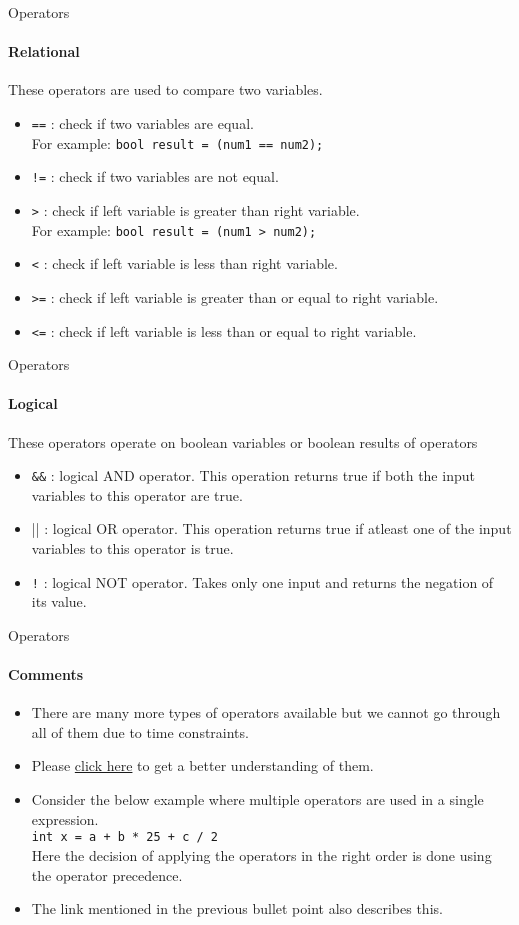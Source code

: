 \documentclass[aspectratio=169]{beamer}
\begin{document}
\begin{frame}[fragile]{Operators}
    \framesubtitle{Relational}
    These operators are used to compare two variables.
    \begin{itemize}
        \item \verb|==| : check if two variables are equal. \\For example: \verb|bool result = (num1 == num2);|
        \item \verb|!=| : check if two variables are not equal.
        \item \verb|>| : check if left variable is greater than right variable.\\For example: \verb|bool result = (num1 > num2);|
        \item \verb|<| : check if left variable is less than right variable.
        \item \verb|>=| : check if left variable is greater than or equal to right variable.
        \item \verb|<=| : check if left variable is less than or equal to right variable.
    \end{itemize}
\end{frame}

\begin{frame}[fragile]{Operators}
    \framesubtitle{Logical}
    These operators operate on boolean variables or boolean results of operators
    \begin{itemize}
        \item \verb|&&| : logical AND operator. This operation returns true if both the input variables to this operator are true.
        \item || : logical OR operator. This operation returns true if atleast one of the input variables to this operator is true.
        \item \verb|!| : logical NOT operator. Takes only one input and returns the negation of its value.
    \end{itemize}
\end{frame}

\begin{frame}[fragile]{Operators}
    \framesubtitle{Comments}
    \begin{itemize}
        \item There are many more types of operators available but we cannot go through all of them due to time constraints.
        \item Please \href{https://www.tutorialspoint.com/cplusplus/cpp_operators.htm}{click here} to get a better understanding of them.
        \item Consider the below example where multiple operators are used in a single expression.\\ \verb|int x = a + b * 25 + c / 2| \\ Here the decision of applying the operators in the right order is done using the operator precedence.
        \item The link mentioned in the previous bullet point also describes this.
    \end{itemize}
\end{frame}
\end{document}
